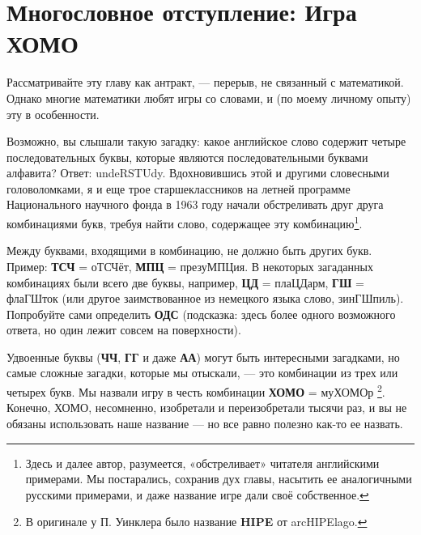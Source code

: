 \chapter{Многословное отступление: Игра ХОМО}




Рассматривайте эту главу как антракт, --- перерыв, не связанный с математикой. Однако многие математики любят игры со словами, и (по моему личному опыту) эту в особенности. 

Возможно, вы слышали такую загадку: какое английское слово содержит четыре последовательных буквы, которые являются последовательными буквами алфавита?
Ответ: undeRSTUdy.
Вдохновившись этой и другими словесными головоломками, я и еще трое старшеклассников на летней программе Национального научного фонда в 1963 году начали обстреливать друг друга комбинациями букв, требуя найти слово, содержащее эту комбинацию\footnote{Здесь и далее автор, разумеется, «обстреливает» читателя английскими примерами. Мы постарались, сохранив дух главы, насытить ее аналогичными русскими примерами, и даже название игре дали своё собственное. \pr}.

Между буквами, входящими в комбинацию, не должно быть других букв.
Пример:
\textbf{ТСЧ} = оТСЧёт,
\textbf{МПЦ} = презуМПЦия.
В некоторых загаданных комбинациях были всего две буквы, например, 
\textbf{ЦД} = плаЦДарм, 
\textbf{ГШ} = флаГШток (или другое заимствованное из немецкого языка слово, зинГШпиль).
Попробуйте сами определить \textbf{ОДС} (подсказка: здесь более одного возможного ответа, но один лежит совсем на поверхности). 

Удвоенные буквы 
(\textbf{ЧЧ}, \textbf{ГГ} и даже \textbf{АА}) могут быть интересными загадками, но самые сложные загадки, которые мы отыскали, --- это комбинации из трех или четырех букв.
Мы назвали игру в честь комбинации \textbf{ХОМО} = муХОМОр%
\footnote{В оригинале у П. Уинклера было название \textbf{HIPE} от arcHIPElago.}.
Конечно, ХОМО, несомненно, изобретали и переизобретали тысячи раз, и вы не обязаны использовать наше название --- но все равно полезно как-то ее назвать. 

